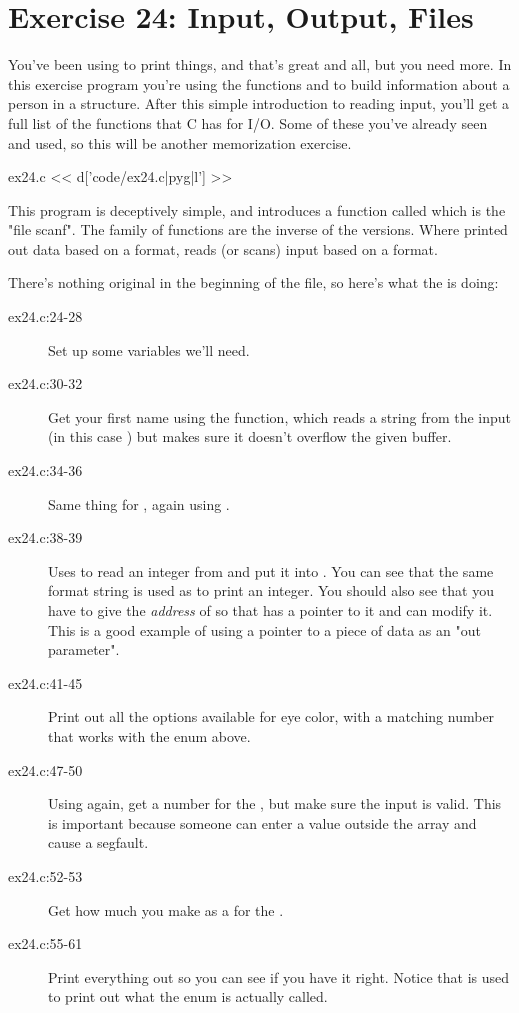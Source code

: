 

\chapter{Exercise 24: Input, Output, Files}

You've been using  to print things, and that's great and all, but
you need more.  In this exercise program you're using the functions
 and  to build information about a person in a
structure.  After this simple introduction to reading input, you'll get
a full list of the functions that C has for I/O.  Some of these you've
already seen and used, so this will be another memorization exercise.

\begin{code}{ex24.c}
<< d['code/ex24.c|pyg|l'] >>
\end{code}

This program is deceptively simple, and introduces a function called
 which is the "file scanf".  The  family of
functions are the inverse of the  versions.  Where 
 printed out data based on a format,  reads
(or scans) input based on a format.

There's nothing original in the beginning of the file, so here's what
the  is doing:

\begin{description}
\item[ex24.c:24-28] Set up some variables we'll need.
\item[ex24.c:30-32] Get your first name using the  function, which reads a
    string from the input (in this case ) but makes sure it
    doesn't overflow the given buffer.
\item[ex24.c:34-36] Same thing for , again using .
\item[ex24.c:38-39] Uses  to read an integer from  and put it
    into .  You can see that the same format string is used
    as  to print an integer.  You should also see that you have
    to give the \emph{address} of  so that  has
    a pointer to it and can modify it.  This is a good example of using a
    pointer to a piece of data as an "out parameter".
\item[ex24.c:41-45] Print out all the options available for eye color, with a matching
    number that works with the  enum above.
\item[ex24.c:47-50] Using  again, get a number for the , 
    but make sure the input is valid.  This is important because someone can
    enter a value outside the  array and cause a 
    segfault.
\item[ex24.c:52-53] Get how much you make as a  for the .
\item[ex24.c:55-61] Print everything out so you can see if you have it right.  Notice
    that  is used to print out what the 
    enum is actually called.
\end{description}


